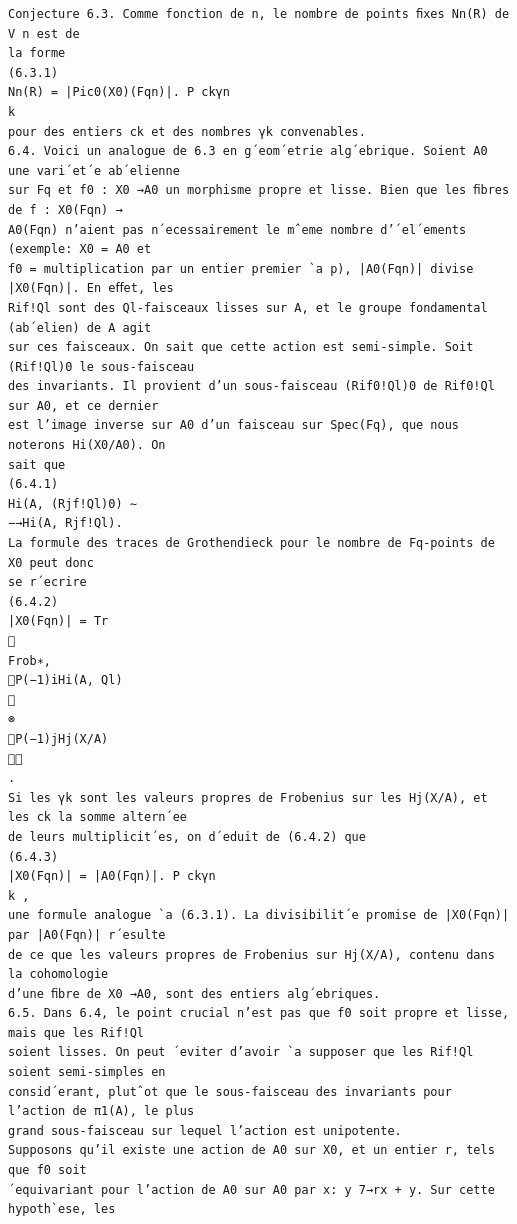 \documentclass[11pt]{article}
\begin{document}
\begin{Verbatim}[breaklines=true,fontsize=\small]
Conjecture 6.3. Comme fonction de n, le nombre de points ﬁxes Nn(R) de V n est de
la forme
(6.3.1)
Nn(R) = |Pic0(X0)(Fqn)|. P ckγn
k
pour des entiers ck et des nombres γk convenables.
6.4. Voici un analogue de 6.3 en g´eom´etrie alg´ebrique. Soient A0 une vari´et´e ab´elienne
sur Fq et f0 : X0 →A0 un morphisme propre et lisse. Bien que les ﬁbres de f : X0(Fqn) →
A0(Fqn) n’aient pas n´ecessairement le mˆeme nombre d’´el´ements (exemple: X0 = A0 et
f0 = multiplication par un entier premier `a p), |A0(Fqn)| divise |X0(Fqn)|. En eﬀet, les
Rif!Ql sont des Ql-faisceaux lisses sur A, et le groupe fondamental (ab´elien) de A agit
sur ces faisceaux. On sait que cette action est semi-simple. Soit (Rif!Ql)0 le sous-faisceau
des invariants. Il provient d’un sous-faisceau (Rif0!Ql)0 de Rif0!Ql sur A0, et ce dernier
est l’image inverse sur A0 d’un faisceau sur Spec(Fq), que nous noterons Hi(X0/A0). On
sait que
(6.4.1)
Hi(A, (Rjf!Ql)0) ∼
−→Hi(A, Rjf!Ql).
La formule des traces de Grothendieck pour le nombre de Fq-points de X0 peut donc
se r´ecrire
(6.4.2)
|X0(Fqn)| = Tr

Frob∗,
P(−1)iHi(A, Ql)

⊗
P(−1)jHj(X/A)

.
Si les γk sont les valeurs propres de Frobenius sur les Hj(X/A), et les ck la somme altern´ee
de leurs multiplicit´es, on d´eduit de (6.4.2) que
(6.4.3)
|X0(Fqn)| = |A0(Fqn)|. P ckγn
k ,
une formule analogue `a (6.3.1). La divisibilit´e promise de |X0(Fqn)| par |A0(Fqn)| r´esulte
de ce que les valeurs propres de Frobenius sur Hj(X/A), contenu dans la cohomologie
d’une ﬁbre de X0 →A0, sont des entiers alg´ebriques.
6.5. Dans 6.4, le point crucial n’est pas que f0 soit propre et lisse, mais que les Rif!Ql
soient lisses. On peut ´eviter d’avoir `a supposer que les Rif!Ql soient semi-simples en
consid´erant, plutˆot que le sous-faisceau des invariants pour l’action de π1(A), le plus
grand sous-faisceau sur lequel l’action est unipotente.
Supposons qu’il existe une action de A0 sur X0, et un entier r, tels que f0 soit
´equivariant pour l’action de A0 sur A0 par x: y 7→rx + y. Sur cette hypoth`ese, les


\end{Verbatim}
\end{document}
